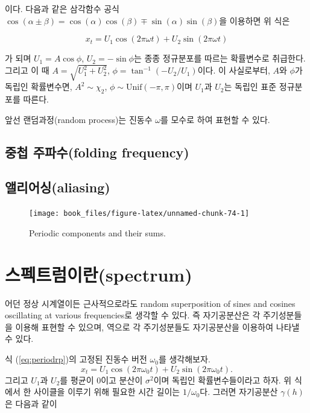 \documentclass[b5paper,]{book}
\theoremstyle{definition}
\theoremstyle{definition}
\theoremstyle{definition}
\theoremstyle{remark}
\let\BeginKnitrBlock\begin \let\EndKnitrBlock\end
\begin{document}
이다. 다음과 같은 삼각함수 공식
\(\cos (\alpha \pm \beta)= \cos (\alpha) \cos (\beta) \mp \sin(\alpha)\sin(\beta)\)을
이용하면 위 식은

\begin{equation}\label{eq:periodrp}
x_{t}=U_{1}\cos(2\pi\omega t) + U_{2}\sin(2\pi\omega t)
\end{equation}

가 되며 \(U_{1}=A\cos \phi\), \(U_{2}=-\sin\phi\)는 종종 정규분포를
따르는 확률변수로 취급한다. 그리고 이 때
\(A=\sqrt{U_{1}^{2}+U_{2}^{2}}\), \(\phi=\tan^{-1}(-U_{2}/U_{1})\)이다.
이 사실로부터, \(A\)와 \(\phi\)가 독립인 확률변수면,
\(A^{2}\sim \chi_{2}\), \(\phi \sim \text{Unif}(-\pi, \pi)\)이며
\(U_{1}\)과 \(U_{2}\)는 독립인 표준 정규분포를 따른다.

앞선 랜덤과정(random process)는 진동수 \(\omega\)를 모수로 하여 표현할
수 있다.

\subsection{중첩 주파수(folding frequency)}\label{-folding-frequency}

\subsection{앨리어싱(aliasing)}\label{aliasing}

\begin{figure}

{\centering \texttt{[image: book\_files/figure-latex/unnamed-chunk-74-1]} 

}

\caption{Periodic components and their sums.}\label{fig:unnamed-chunk-74}
\end{figure}

\section{스펙트럼이란(spectrum)}\label{spectrum}

\BeginKnitrBlock{theorem}[정상과정의 스펙트럼 표현]
\protect\hypertarget{thm:unnamed-chunk-75}{}{\label{thm:unnamed-chunk-75}
{} } 어던 정상 시계열이든
근사적으로라도 random superposition of sines and cosines oscillating at
various frequencies로 생각할 수 있다. 즉 자기공분산은 각 주기성분들을
이용해 표현할 수 있으며, 역으로 각 주기성분들도 자기공분산을 이용하여
나타낼 수 있다.
\EndKnitrBlock{theorem}

식 (\eqref{eq:periodrp})의 고정된 진동수 버전 \(\omega_{0}\)를 생각해보자.
\[x_{t}=U_{1}\cos (2\pi\omega_{0}t) + U_{2}\sin(2\pi\omega_{0}t).\]
그리고 \(U_{1}\)과 \(U_{2}\)를 평균이 0이고 분산이 \(\sigma^{2}\)이며
독립인 확률변수들이라고 하자. 위 식에서 한 사이클을 이루기 위해 필요한
시간 길이는 \(1/\omega_{0}\)다. 그러면 자기공분산 \(\gamma(h)\)은 다음과
같이
\end{document}
